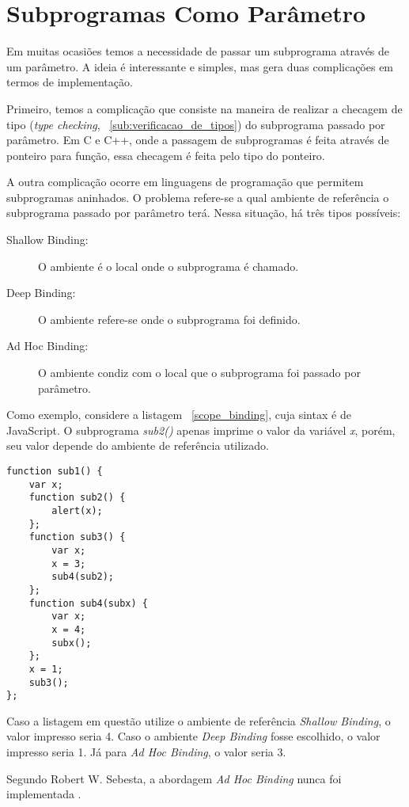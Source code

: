 
\section{Subprogramas Como Parâmetro} %
\label{sec:subprogramas_como_parametro}
Em muitas ocasiões temos a necessidade de passar um subprograma através de um parâmetro. A ideia é interessante e simples, mas gera duas complicações em termos de implementação.

Primeiro, temos a complicação que consiste na maneira de realizar a checagem de tipo (\textit{type checking}, ~\ref{sub:verificacao_de_tipos}) do subprograma passado por parâmetro. Em C e C++, onde a passagem de subprogramas é feita através de ponteiro para função, essa checagem é feita pelo tipo do ponteiro.

A outra complicação ocorre em linguagens de programação que permitem subprogramas aninhados. O problema refere-se a qual ambiente de referência o subprograma passado por parâmetro terá. Nessa situação, há três tipos possíveis:
\begin{description}
	\item[Shallow Binding:] O ambiente é o local onde o subprograma é chamado.
	\item[Deep Binding:] O ambiente refere-se onde o subprograma foi definido.
	\item[Ad Hoc Binding:] O ambiente condiz com o local que o subprograma foi passado por parâmetro.
\end{description}

Como exemplo, considere a listagem ~\ref{scope_binding}, cuja sintax é de JavaScript. O subprograma \textit{sub2()} apenas imprime o valor da variável \textit{x}, porém, seu valor depende do ambiente de referência utilizado. 

\begin{lstlisting}[caption=Código retirado de \cite{sebesta}]
function sub1() {
	var x;
	function sub2() {
		alert(x);
	};
	function sub3() {
		var x;
		x = 3;
		sub4(sub2);
	};
	function sub4(subx) {
		var x;
		x = 4;
		subx();
	};
	x = 1;
	sub3();
};
\end{lstlisting}
\label{scope_binding}

Caso a listagem em questão utilize o ambiente de referência \textit{Shallow Binding}, o valor impresso seria 4. Caso o ambiente \textit{Deep Binding} fosse escolhido, o valor impresso seria 1. Já para \textit{Ad Hoc Binding}, o valor seria 3.

Segundo Robert W. Sebesta, a abordagem \textit{Ad Hoc Binding} nunca foi implementada \cite{sebesta}.
